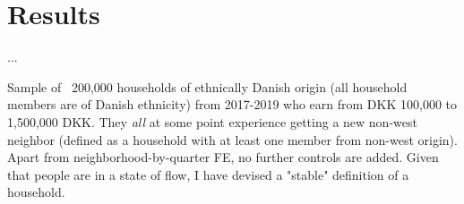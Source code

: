 \documentclass[../main.tex]{subfiles}
\begin{document}
\section{Results}
\label{sec:results}

...

Sample of ~200,000 households of ethnically Danish origin (all household members are of Danish ethnicity) from 2017-2019 who earn from DKK 100,000 to 1,500,000 DKK. They \textit{all} at some point experience getting a new non-west neighbor (defined as a household with at least one member from non-west origin). Apart from neighborhood-by-quarter FE, no further controls are added. Given that people are in a state of flow, I have devised a "stable" definition of a household.
\end{document}
